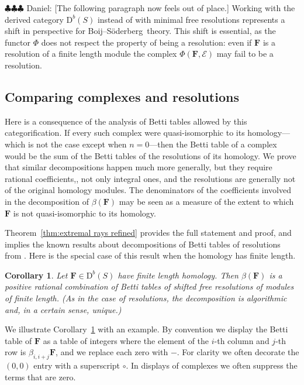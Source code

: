 \documentclass[12pt]{amsart}
\newtheorem{cor}[lemma]{Corollary}
\theoremstyle{definition}
\theoremstyle{remark}
\newcommand{\cE}{\mathcal{E}}
\newcommand{\FF}{\mathbf{F}}
\newcommand{\DD}{\mathrm{D}}
\newcommand{\daniel}[1]{{\color{green} \sf $\clubsuit\clubsuit\clubsuit$ Daniel: [#1]}}
\def\BS{Boij--S\"oderberg~}
\begin{document}
\daniel{The following paragraph now feels out of place.}
Working with the derived category $\DD^b(S)$ instead of with minimal free resolutions represents a shift in perspective for \BS theory.  This shift is essential, as the functor $\Phi$ does not respect the property of being a resolution: even if $\FF$ is a resolution of a finite length module the complex $\Phi(\FF,\cE)$ may fail to be a resolution.  


\subsection*{Comparing complexes and resolutions}
Here is a consequence of the analysis of Betti tables allowed by this categorification. If every such complex were quasi-isomorphic to its homology---which is not the case except when $n=0$---then the Betti table of a complex would be the sum of the Betti tables of the resolutions of its homology.  We prove that similar decompositions happen much more generally, but they require rational coefficients,, not only integral ones, and the resolutions are generally not of the original homology modules. The denominators of the coefficients involved in the decomposition of $\beta(\FF)$ may be seen as a measure of the extent to which $\FF$ is not quasi-isomorphic to its homology. 

Theorem~\ref{thm:extremal rays refined} provides the full statement and proof, and implies the known results about decompositions of Betti tables
of resolutions from \cites{eis-schrey1,boij-sod2}.  Here is the special case of this result when the homology has finite length. 
\begin{cor}\label{cor:decompose}
Let $\FF\in \DD^b(S)$ have finite length homology.  Then $\beta(\FF)$ is a positive rational combination of Betti tables of shifted free resolutions of modules of finite length. (As in the case of resolutions, the decomposition is algorithmic and, in a certain sense, unique.)
\end{cor}


We illustrate Corollary~\ref{cor:decompose} with an example.  By convention we display the Betti table of $\FF$ as a table
of integers where the element of the $i$-th column and $j$-th row is $\beta_{i,i+j}\FF$, and we replace each zero with $-$. For clarity we often decorate the $(0,0)$ entry
with a superscript $\circ$. In displays of complexes we often suppress the terms that are zero.
\end{document}

